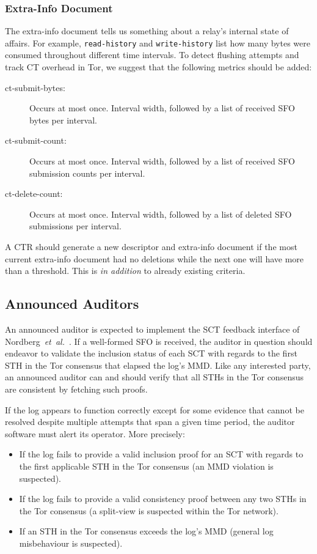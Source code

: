 \subsubsection{Extra-Info Document}
The extra-info document tells us something about a relay's internal state of
affairs.  For example, \texttt{read-history} and \texttt{write-history} list how
many bytes were consumed throughout different time intervals.  To detect
flushing attempts and track CT overhead in Tor, we suggest that the following
metrics should be added:
\begin{description}
	\item[ct-submit-bytes:] Occurs at most once.  Interval width, followed by a
		list of received SFO bytes per interval.
	\item[ct-submit-count:] Occurs at most once.  Interval width, followed by a
		list of received SFO submission counts per interval.
	\item[ct-delete-count:] Occurs at most once.  Interval width, followed by a
		list of deleted SFO submissions per interval.
\end{description}

A CTR should generate a new descriptor and extra-info document if the most
current extra-info document had no deletions while the next one will have more
than a threshold.  This is \emph{in addition} to already existing criteria.

\subsection{Announced Auditors}
An announced auditor is expected to implement the SCT feedback interface of
Nordberg~\emph{et~al.}~\cite{nordberg}.  If a well-formed SFO is received, the
auditor in question should endeavor to validate the inclusion status of each SCT
with regards to the first STH in the Tor consensus that elapsed the log's MMD.
Like any interested party, an announced auditor can and should verify that all
STHs in the Tor consensus are consistent by fetching such proofs.

If the log appears to function correctly except for some evidence that cannot be
resolved despite multiple attempts that span a given time period, the auditor
software must alert its operator.  More precisely:
\begin{itemize}
	\item If the log fails to provide a valid inclusion proof for an SCT with
		regards to the first applicable STH in the Tor consensus
		(an MMD violation is suspected).
	\item If the log fails to provide a valid consistency proof between any two
		STHs in the Tor consensus
		(a split-view is suspected within the Tor network).
	\item If an STH in the Tor consensus exceeds the log's MMD (general log
		misbehaviour is suspected).
\end{itemize}


